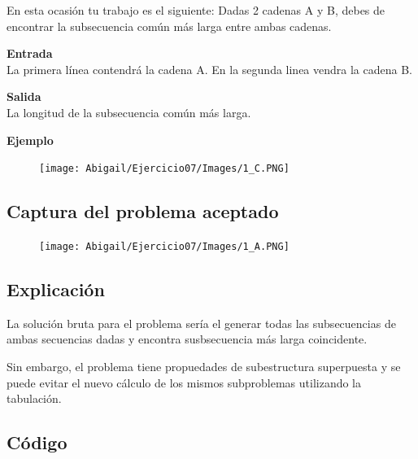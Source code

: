 \documentclass[12pt]{article}
\begin{document}
            En esta ocasión tu trabajo es el siguiente: Dadas 2 cadenas A y B, debes de encontrar la subsecuencia común más larga entre ambas cadenas.

            \begin{multicols}{2}
                \noindent\textbf{Entrada} \\ 
                La primera línea contendrá la cadena A. En la segunda linea vendra la cadena B.
                
            \columnbreak
                
                \noindent\textbf{Salida} \\
                La longitud de la subsecuencia común más larga.
            \end{multicols}
            
            \textbf{Ejemplo}    \\
            \begin{figure}[h!]
    	        \centering
    	        \texttt{[image: Abigail/Ejercicio07/Images/1\_C.PNG]}
    	 	\end{figure} 
    \newpage

        \subsection{Captura del problema aceptado}
            \begin{figure}[h!]
    	        \centering
    	        \texttt{[image: Abigail/Ejercicio07/Images/1\_A.PNG]}
    	 	\end{figure} 
        
        \subsection{Explicación}
            La solución bruta para el problema sería el generar todas las subsecuencias de ambas secuencias dadas y encontra susbsecuencia más larga coincidente. 

            Sin embargo, el problema tiene propuedades de subestructura superpuesta y se puede evitar el nuevo cálculo de los mismos subproblemas utilizando la tabulación. 

        \subsection{Código}
        	\inputminted{c++}{Ejercicio07/Code/LCS.c}

\newpage
\end{document}
